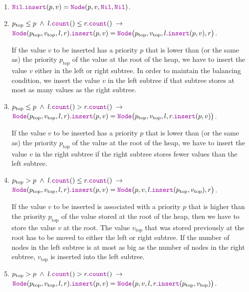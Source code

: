 \begin{enumerate}
\item $\mytt{Nil}.\mytt{insert}(p,v) = \mytt{Node}(p,v,\mytt{Nil}, \mytt{Nil})$.
\item $p_{\mathrm{top}} \leq p \;\wedge\; l.\mytt{count}() \leq r.\mytt{count}() \;\rightarrow $   \\[0.1cm]
      \hspace*{1.3cm} 
      $\mytt{Node}(p_{\mathrm{top}},v_\mathrm{top},l,r).\mytt{insert}(p,v) =
                 \mytt{Node}\bigl(p_\mathrm{top},v_\mathrm{top},l.\mytt{insert}(p,v), r\bigr)$.
                 
      If the value $v$ to be inserted has a priority $p$ that is lower than (or the same as) the priority
      $p_{\mathrm{top}}$ of
      the value at the root of the heap, we have to insert the value $v$ either in the left or right
      subtree.  In order to maintain the balancing condition, we insert the value $v$ in the left
      subtree if that subtree stores at most as many values as the right subtree.
\item $p_{\mathrm{top}} \leq p \;\wedge\; l.\mytt{count}() > r.\mytt{count}() \;\rightarrow $   \\[0.1cm]
      \hspace*{1.3cm} 
      $\mytt{Node}(p_{\mathrm{top}},v_\mathrm{top},l,r).\mytt{insert}(p,v) =
                 \mytt{Node}\bigl(p_\mathrm{top},v_\mathrm{top},l,r.\mytt{insert}(p,v)\bigr)$.

      If the value $v$ to be inserted has a priority $p$ that is lower than (or the same as) the priority
      $p_{\mathrm{top}}$ of
      the value at the root of the heap, we have to insert the value $v$ in the right
      subtree if the right subtree  stores fewer values than the left subtree.
\item $p_{\mathrm{top}} > p \;\wedge\; l.\mytt{count}() \leq r.\mytt{count}() \;\rightarrow $ \\[0.1cm]
      \hspace*{1.3cm} 
      $\mytt{Node}(p_{\mathrm{top}},v_\mathrm{top},l,r).\mytt{insert}(p,v) =
                 \mytt{Node}\bigl(p,v,l.\mytt{insert}(p_\mathrm{top},v_\mathrm{top}), r\bigr)$.

      If the value $v$ to be inserted is associated with a priority $p$ that is higher than the priority
      $p_{\mathrm{top}}$ of
      the value stored at the root of the heap, then we have to store the value $v$ at the root.
      The value $v_\mathrm{top}$ that was stored previously at the root has to be moved to either
      the left or right subtree.  If the number of nodes in the left subtree is at most as big as
      the number of nodes in the right subtree, $v_\mathrm{top}$ is inserted into the left subtree.
\item $p_{\mathrm{top}} > p \;\wedge\; l.\mytt{count}() > r.\mytt{count}() \;\rightarrow $ \\[0.1cm] 
      \hspace*{1.3cm} 
      $\mytt{Node}(p_{\mathrm{top}},v_\mathrm{top},l,r).\mytt{insert}(p,v) =
                 \mytt{Node}\bigl(p,v,l,r.\mytt{insert}(p_\mathrm{top},v_\mathrm{top})\bigr)$.


\end{enumerate}
